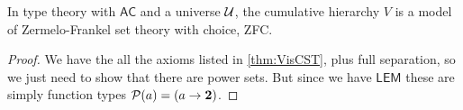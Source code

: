 \begin{thm}\label{thm:zfc}
In type theory with $\mathsf{AC}$ and a universe $\mathcal{U}$, the cumulative hierarchy $V$ is a model of Zermelo-Frankel set theory with choice, ZFC.
\end{thm}

\begin{proof}
We have the all the axioms listed in \autoref{thm:VisCST}, plus full separation, so we just need to show that there are power sets.  But since we have $\mathsf{LEM}$ these are simply function types $\mathcal{P}(a) = (a\to\mathbf{2})$.
\end{proof}



